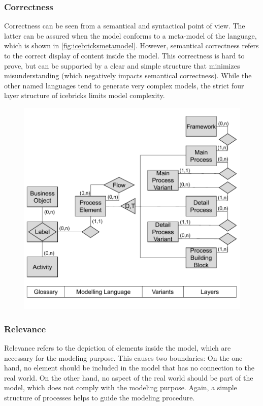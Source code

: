 	 
	 \subsubsection{Correctness}
	 Correctness can be seen from a semantical and syntactical point of view. The latter can be assured when the model conforms to a meta-model of the language, which is shown in \Fig \ref{fig:icebricksmetamodel}. However, semantical correctness refers to the correct display of content inside the model. This correctness is hard to prove, but can be supported by a clear and simple structure that minimizes misunderstanding (which negatively impacts semantical correctness). While the other named languages tend to generate very complex models, the strict four layer structure of icebricks limits model complexity. 
	 
	 	 \begin{figure}[caption={icebricks Meta Model}, label={fig:icebricksmetamodel}]
	 	{	\includegraphics[width=.8\textwidth]{figures/icebricksmetamodel.pdf} \\ \parbox{0.8\textwidth}{}
 	}
	 
	 \end{figure} 
 
	 \subsubsection{Relevance}
	 Relevance refers to the depiction of elements inside the model, which are necessary for the modeling purpose. This causes two boundaries: On the one hand, no element should be included in the model that has no connection to the real world. On the other hand, no aspect of the real world should be part of the model, which does not comply with the modeling purpose. Again, a simple structure of processes helps to guide the modeling procedure. 
	 
